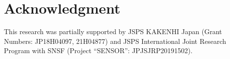 \documentclass[sigconf]{acmart}
\begin{document}


% 

%

% 

% 



\section*{Acknowledgment}
This research was partially supported by JSPS KAKENHI Japan (Grant Numbers: JP18H04097, 21H04877) and JSPS International Joint Research Program with SNSF (Project ``SENSOR'': JPJSJRP20191502).




\end{document}
